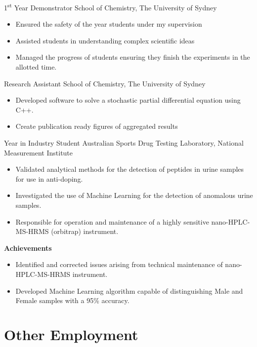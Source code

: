 {1\textsuperscript{st} Year Demonstrator}
{School of Chemistry, The University of Sydney}
{}{}
{%
  \begin{itemize}
    \item Ensured the safety of the  year students under my supervision
    \item Assisted students in understanding complex scientific ideas
    \item Managed the progress of students ensuring they finish the experiments in the allotted time.
  \end{itemize}
}
\vspace{1em}

{Research Assistant}
{School of Chemistry, The University of Sydney}
{}{}{%
  \begin{itemize}
    \item Developed software to solve a stochastic partial differential equation using C++.
    \item Create publication ready figures of aggregated results
  \end{itemize}
}
\vspace{1em}

{Year in Industry Student}
{Australian Sports Drug Testing Laboratory, National Measurement Institute}
{}{}
{%
  \begin{itemize}
    \item Validated analytical methods for the detection of peptides in urine samples for
      use in anti-doping.
    \item Investigated the use of Machine Learning for the detection of anomalous urine samples.
    \item Responsible for operation and maintenance of a highly sensitive nano-HPLC-MS-HRMS
      (orbitrap) instrument.
  \end{itemize}
  \textbf{Achievements}
  \begin{itemize}
    \item Identified and corrected issues arising from technical maintenance of nano-HPLC-MS-HRMS instrument.
    \item Developed Machine Learning algorithm capable of distinguishing Male and Female samples with a 95\% accuracy.
  \end{itemize}
}


\pagebreak
\section{Other Employment}

